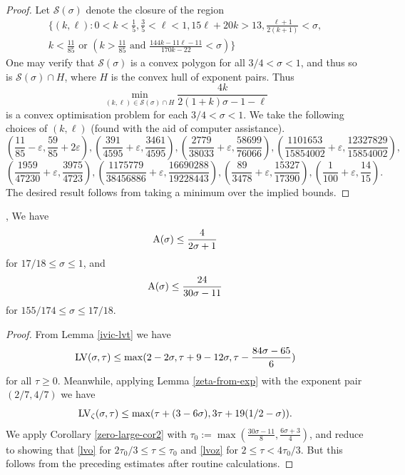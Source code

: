 \begin{proof}
Let $\mathcal{S}(\sigma)$ denote the closure of the region
\begin{align*}
\Bigg\{(k, \ell) : 0 < k < \frac{1}{5}, \frac{3}{5} < \ell < 1, 15\ell + 20k > 13, \frac{\ell + 1}{2(k + 1)} < \sigma, \\
k < \frac{11}{85} \text{ or } \left(k > \frac{11}{85} \text{ and } \frac{144k - 11\ell - 11}{170k - 22} < \sigma\right)\Bigg\}
\end{align*}
One may verify that $\mathcal{S}(\sigma)$ is a convex polygon for all $3/4 < \sigma < 1$, and thus so is $\mathcal{S}(\sigma) \cap H$, where $H$ is the convex hull of exponent pairs. Thus
\[
\min_{(k, \ell) \in \mathcal{S}(\sigma) \cap H}\frac{4k}{2(1 + k)\sigma - 1 - \ell}
\]
is a convex optimisation problem for each $3/4 < \sigma < 1$.
We take the following choices of $(k, \ell)$ (found with the aid of computer assistance).
\[
\left(\frac{11}{85} - \varepsilon, \frac{59}{85} + 2\varepsilon\right),
\left(\frac{391}{4595} + \varepsilon, \frac{3461}{4595}\right),
\left(\frac{2779}{38033} + \varepsilon, \frac{58699}{76066}\right),
\left(\frac{1101653}{15854002} + \varepsilon, \frac{12327829}{15854002}\right),
\]
\[
\left(\frac{1959}{47230} + \varepsilon, \frac{3975}{4723}\right),
\left(\frac{1175779}{38456886} + \varepsilon, \frac{16690288}{19228443}\right),
\left(\frac{89}{3478} + \varepsilon, \frac{15327}{17390}\right),
\left(\frac{1}{100} + \varepsilon, \frac{14}{15}\right).
\]
The desired result follows from taking a minimum over the implied bounds.
\end{proof}


\begin{lemma}\label{ivic-zero-density}\cite{ivic_exponent_pairs}, \cite[Theorem 11.2]{ivic} We have
    $$ \mathrm{A}(\sigma) \leq \frac{4}{2\sigma+1}$$
    for $17/18 \leq \sigma \leq 1$, and
    $$ \mathrm{A}(\sigma) \leq \frac{24}{30\sigma-11}$$
    for $155/174 \leq \sigma \leq 17/18$.
\end{lemma}
\literature
{}

\begin{proof}  From Lemma \ref{ivic-lvt} we have
$$  \mathrm{LV}(\sigma,\tau) \leq \max( 2-2\sigma, \tau + 9-12\sigma, \tau - \frac{84\sigma-65}{6})$$
for all $\tau \geq 0$.  Meanwhile, applying Lemma \ref{zeta-from-exp} with the exponent pair $(2/7,4/7)$ we have
$$ \mathrm{LV}_\zeta(\sigma,\tau) \leq \max( \tau + (3-6\sigma), 3\tau + 19(1/2-\sigma)).$$
We apply Corollary \ref{zero-large-cor2} with $\tau_0 := \max( \frac{30\sigma-11}{8}, \frac{6\sigma+3}{4} )$, and reduce to showing that \eqref{lvo} for $2\tau_0/3 \leq \tau \leq \tau_0$ and \eqref{lvoz} for $2 \leq \tau < 4\tau_0/3$.  But this follows from the preceding estimates after routine calculations.
\end{proof}

